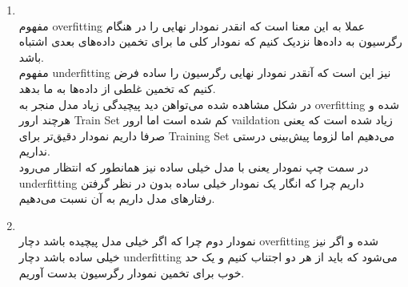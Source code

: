 \noindent
\begin{enumerate}
    \item \phantom{text}
    \\
    مفهوم overfitting عملا به این معنا است که انقدر نمودار نهایی را در هنگام رگرسیون به داده‌ها نزدیک کنیم که نمودار کلی ما برای تخمین داده‌های بعدی اشتباه باشد.
    \\
    مفهوم underfitting نیز این است که آنقدر نمودار نهایی رگرسیون را ساده فرض کنیم که تخمین‌ غلطی از داده‌ها به ما بدهد.
    \\
    در شکل مشاهده شده می‌تواهن دید پیچیدگی زیاد مدل منجر به overfitting شده و هرچند ارور Train Set کم شده است اما ارور vaildation زیاد شده است که یعنی صرفا داریم نمودار دقیق‌تر برای Training Set می‌دهیم اما لزوما پیش‌بینی درستی نداریم.
    \\
    در سمت چپ نمودار یعنی با مدل خیلی ساده نیز همانطور که انتظار می‌رود underfitting داریم چرا که انگار یک نمودار خیلی ساده بدون در نظر گرفتن رفتارهای مدل داریم به آن نسبت می‌دهیم.

    \item \phantom{text}
    \\
    نمودار دوم چرا که اگر خیلی مدل پیچیده باشد دچار overfitting شده و اگر نیز خیلی ساده باشد دچار underfitting می‌شود که باید از هر دو اجتناب کنیم و یک حد خوب برای تخمین نمودار رگرسیون بدست آوریم.

\end{enumerate}
 
